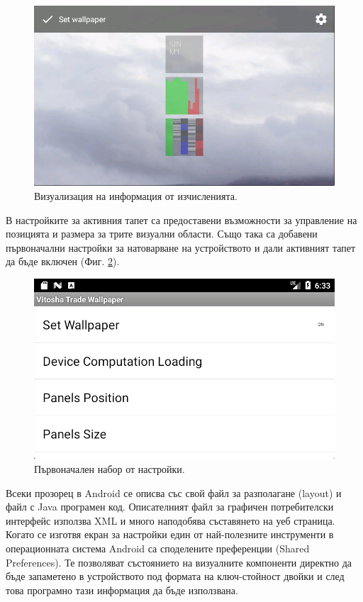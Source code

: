 \documentclass[book,14pt,oneside,openany]{memoir}
\begin{document}
\begin{figure}[h]
  \centering
  \includegraphics[width=1.0\linewidth]{pic0019}
  \caption{Визуализация на информация от изчисленията.}
\label{fig:pic0019}
\end{figure}
\FloatBarrier

В настройките за активния тапет са предоставени възможности за управление на позицията и размера за трите визуални области. Също така са добавени първоначални настройки за натоварване на устройството и дали активният тапет да бъде включен (Фиг. \ref{fig:pic0020}). 

\begin{figure}[h]
  \centering
  \includegraphics[width=1.0\linewidth]{pic0020}
  \caption{Първоначален набор от настройки.}
\label{fig:pic0020}
\end{figure}
\FloatBarrier

Всеки прозорец в Android се описва със свой файл за разполагане (layout) и файл с Java програмен код. Описателният файл за графичен потребителски интерфейс използва XML и много наподобява съставянето на уеб страница. Когато се изготвя екран за настройки един от най-полезните инструменти в операционната система Android са споделените преференции (Shared Preferences). Те позволяват състоянието на визуалните компоненти директно да бъде запаметено в устройството под формата на ключ-стойност двойки и след това програмно тази информация да бъде използвана. 
\end{document}
